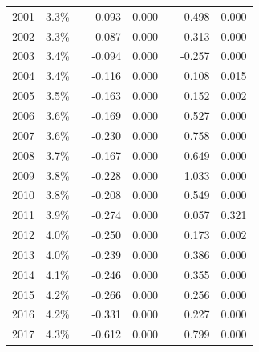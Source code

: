 \begin{table}[H]
\begin{tabular}{lrrrrrrr}
		2001       & 3.3\% &  & -0.093            & 0.000           &  & -0.498           & 0.000          \\
		2002       & 3.3\% &  & -0.087            & 0.000           &  & -0.313           & 0.000          \\
		2003       & 3.4\% &  & -0.094            & 0.000           &  & -0.257           & 0.000          \\
		2004       & 3.4\% &  & -0.116            & 0.000           &  & 0.108            & 0.015          \\
		2005       & 3.5\% &  & -0.163            & 0.000           &  & 0.152            & 0.002          \\
		2006       & 3.6\% &  & -0.169            & 0.000           &  & 0.527            & 0.000          \\
		2007       & 3.6\% &  & -0.230            & 0.000           &  & 0.758            & 0.000          \\
		2008       & 3.7\% &  & -0.167            & 0.000           &  & 0.649            & 0.000          \\
		2009       & 3.8\% &  & -0.228            & 0.000           &  & 1.033            & 0.000          \\
		2010       & 3.8\% &  & -0.208            & 0.000           &  & 0.549            & 0.000          \\
		2011       & 3.9\% &  & -0.274            & 0.000           &  & 0.057            & 0.321          \\
		2012       & 4.0\% &  & -0.250            & 0.000           &  & 0.173            & 0.002          \\
		2013       & 4.0\% &  & -0.239            & 0.000           &  & 0.386            & 0.000          \\
		2014       & 4.1\% &  & -0.246            & 0.000           &  & 0.355            & 0.000          \\
		2015       & 4.2\% &  & -0.266            & 0.000           &  & 0.256            & 0.000          \\
		2016       & 4.2\% &  & -0.331            & 0.000           &  & 0.227            & 0.000          \\
		2017       & 4.3\% &  & -0.612            & 0.000           &  & 0.799            & 0.000 
		\\ \hline
	\end{tabular}
\end{table}






